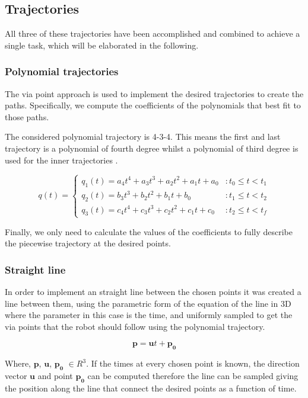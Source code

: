 \documentclass{article}
\begin{document}
\subsection{Trajectories}
All three of these trajectories have been accomplished and combined to achieve a single task, which will be elaborated in the following.
\subsubsection{Polynomial trajectories}
The via point approach is used to implement the desired trajectories to create the paths. Specifically, we compute the coefficients of the polynomials that best fit to those paths.

The considered polynomial trajectory is 4-3-4. This means the first and last trajectory is a polynomial of fourth degree whilst a polynomial of third degree is used for the inner trajectories .

\begin{equation}
q(t) = 
  \begin{cases} 
  q_1(t)= a_4t^4 + a_3t^3 + a_2t^2 + a_1t + a_0 & : t_0 \leq t < t_1 \\
   q_2(t)= b_3t^3 + b_2t^2 + b_1t + b_0 & : t_1 \leq t < t_2 \\
   q_3(t)= c_4t^4 + c_3t^3 + c_2t^2 + c_1t + c_0 & : t_2 \leq t < t_f
  \end{cases}
\end{equation}

Finally, we only need to calculate the values of the coefficients to fully describe the piecewise trajectory at the desired points.

\subsubsection{Straight line}
In order to implement an straight line between the chosen points it was created a line between them, using the parametric form of the equation of the line in 3D where the parameter in this case is the time, and uniformly sampled to get the via points that the robot should follow using the polynomial trajectory.

\begin{equation}
\mathbf{p}=\mathbf{u}t + \mathbf{p_0}
\end{equation}

Where, $\mathbf{p}$, $\mathbf{u}$, $\mathbf{p_0}$ $\in R^3$. If the times at every chosen point is known, the direction vector $\mathbf{u}$ and point $\mathbf{p_0}$ can be computed therefore the line can be sampled giving the position along the line that connect the desired points as a function of time. 
\end{document}
